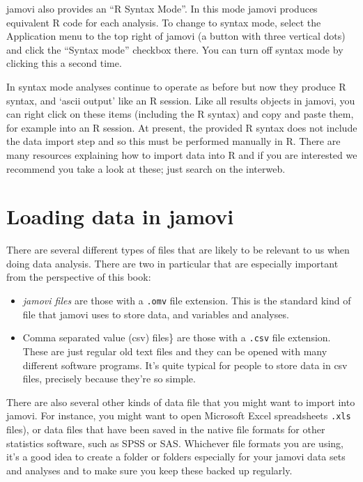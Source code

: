 \documentclass[
]{book}
\providecommand{\tightlist}{%
  \setlength{\itemsep}{0pt}\setlength{\parskip}{0pt}}
\begin{document}
jamovi also provides an ``R Syntax Mode''. In this mode jamovi produces equivalent R code for each analysis. To change to syntax mode, select the Application menu to the top right of jamovi (a button with three vertical dots) and click the ``Syntax mode'' checkbox there. You can turn off syntax mode by clicking this a second time.

In syntax mode analyses continue to operate as before but now they produce R syntax, and `ascii output' like an R session. Like all results objects in jamovi, you can right click on these items (including the R syntax) and copy and paste them, for example into an R session. At present, the provided R syntax does not include the data import step and so this must be performed manually in R. There are many resources explaining how to import data into R and if you are interested we recommend you take a look at these; just search on the interweb.

\hypertarget{load}{%
\section{Loading data in jamovi}\label{load}}

There are several different types of files that are likely to be relevant to us when doing data analysis. There are two in particular that are especially important from the perspective of this book:

\begin{itemize}
\tightlist
\item
  \emph{jamovi files} are those with a \texttt{.omv} file extension. This is the standard kind of file that jamovi uses to store data, and variables and analyses.
\item
  Comma separated value (csv) files\} are those with a \texttt{.csv} file extension. These are just regular old text files and they can be opened with many different software programs. It's quite typical for people to store data in csv files, precisely because they're so simple.
\end{itemize}

There are also several other kinds of data file that you might want to import into jamovi. For instance, you might want to open Microsoft Excel spreadsheets \texttt{.xls} files), or data files that have been saved in the native file formats for other statistics software, such as SPSS or SAS. Whichever file formats you are using, it's a good idea to create a folder or folders especially for your jamovi data sets and analyses and to make sure you keep these backed up regularly.
\end{document}
